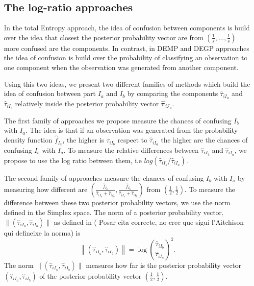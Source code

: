 \documentclass[10pt, a4paper]{article}
\newcommand{\m}[1]{\boldsymbol{#1}}
\begin{document}

\subsection{The log-ratio approaches}
\label{lr_approach}

In the total Entropy approach, the idea of confusion between components is build over the idea that closest the posterior probability vector are from $(\frac{1}{s}, \dots, \frac{1}{s})$ more confused are the components. In contrast, in DEMP and DEGP approaches the idea of confusion is build over the probability of classifying an observation to one component when the observation was generated from another component.

Using this two ideas, we present two different families of methods which build the idea of confusion between part $I_a$ and $I_b$ by comparing the components $\hat{\tau}_{iI_a}$ and $\hat{\tau}_{iI_b}$ relatively inside the posterior probability vector $\hat{\m \tau}_{i \mathcal{I}_s}$. 

The first family of approaches we propose measure the chances of confusing $I_b$ with $I_a$. The idea is that if an observation was generated from the probability density function $\hat{f}_{I_a}$, the higher is $\hat{\tau}_{iI_b}$ respect to $\hat{\tau}_{iI_a}$ the higher are the chances of confusing $I_b$ with $I_a$. To measure the relative differences between  $\hat{\tau}_{iI_b}$ and $\hat{\tau}_{iI_a}$, we propose to use the log ratio between them, i.e $log( \hat{\tau}_{iI_b}/\hat{\tau}_{iI_a})$.

The second family of approaches measure the chances of confusing $I_b$ with $I_a$  by measuring how different are $(\frac{\hat{f}_{I_a}}{\hat{\tau}_{iI_a} + \hat{\tau}_{iI_b}}, \frac{\hat{f}_{I_b}}{\hat{\tau}_{iI_a} + \hat{\tau}_{iI_b}})$ from $(\frac{1}{2}, \frac{1}{2})$. To measure the difference between these two posterior probability vectors, we use the norm defined in the Simplex space. The norm of a posterior probability vector, $\| (\hat{\tau}_{iI_a}, \hat{\tau}_{iI_b}) \|$  as defined in ({\color{red} Posar cita correcte, no crec que sigui l'Aitchison qui defineixe la norma}) \citep{aitchison1986statistical} is
\[
\left\| (\hat{\tau}_{iI_a}, \hat{\tau}_{iI_b}) \right\| = \log (\frac{ \hat{\tau}_{iI_b} }{ \hat{\tau}_{iI_a} })^2.
\]
The norm $\| (\hat{\tau}_{iI_a}, \hat{\tau}_{iI_b}) \|$ measures how far is the posterior probability vector $(\hat{\tau}_{iI_a}, \hat{\tau}_{iI_b})$ of the posterior probability vector $(\frac{1}{2}, \frac{1}{2})$.
\end{document}
